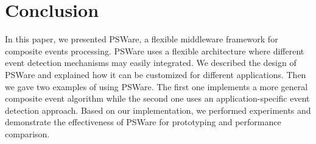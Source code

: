 \section{Conclusion}
\label{sec:conclusion}
In this paper, we presented PSWare, a flexible middleware framework for composite events processing. PSWare uses a flexible architecture where different event detection mechanisms may easily integrated. We described the design of PSWare and explained how it can be customized for different applications. Then we gave two examples of using PSWare. The first one implements a more general composite event algorithm while the second one uses an application-specific event detection approach. Based on our implementation, we performed experiments and demonstrate the effectiveness of PSWare for prototyping and performance comparison.